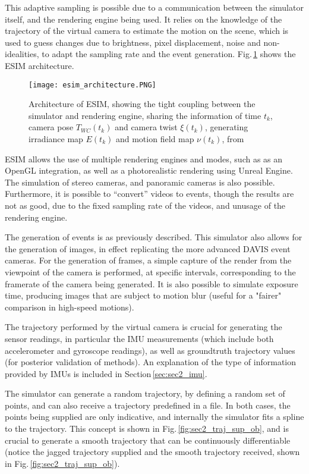  This adaptive sampling is possible due to a communication between the simulator itself, and the rendering engine being used. It relies on the knowledge of the trajectory of the virtual camera to estimate the motion on the scene, which is used to guess changes due to brightness, pixel displacement, noise and non-idealities, to adapt the sampling rate and the event generation. Fig.\,\ref{fig:sec2_esim_architecture} shows the ESIM architecture.

 \begin{figure}[ht]
    \centering
    \texttt{[image: esim\_architecture.PNG]}
    \caption[ESIM architecture]{Architecture of ESIM, showing the tight coupling between the simulator and rendering engine, sharing the information of time $t_k$, camera pose $T_{WC}(t_k)$ and camera twist $\xi(t_k)$, generating irradiance map $E(t_k)$ and motion field map $\nu (t_k)$, from \cite{rebecq2018esim}}
    \label{fig:sec2_esim_architecture}
\end{figure}

ESIM allows the use of multiple rendering engines and modes, such as as an OpenGL integration, as well as a photorealistic rendering using Unreal Engine. The simulation of stereo cameras, and panoramic cameras is also possible. Furthermore, it is possible to “convert” videos to events, though the results are not as good, due to the fixed sampling rate of the videos, and unusage of the rendering engine.

The generation of events is as previously described. This simulator also allows for the generation of images, in effect replicating the more advanced DAVIS event cameras. For the generation of frames, a simple capture of the render from the viewpoint of the camera is performed, at specific intervals, corresponding to the framerate of the camera being generated. It is also possible to simulate exposure time, producing images that are subject to motion blur (useful for a "fairer" comparison in high-speed motions).

The trajectory performed by the virtual camera is crucial for generating the sensor readings, in particular the IMU measurements (which include both accelerometer and gyroscope readings), as well as groundtruth trajectory values (for posterior validation of methods). An explanation of the type of information provided by IMUs is included in Section\,\ref{sec:sec2_imu}.

The simulator can generate a random trajectory, by defining a random set of points, and can also receive a trajectory predefined in a file. In both cases, the points being supplied are only indicative, and internally the simulator fits a spline to the trajectory. This concept is shown in Fig.\,\ref{fig:sec2_traj_sup_ob}, and is crucial to generate a smooth trajectory that can be continuously differentiable (notice the jagged trajectory supplied and the smooth trajectory received, shown in Fig.\,\ref{fig:sec2_traj_sup_ob}). 

